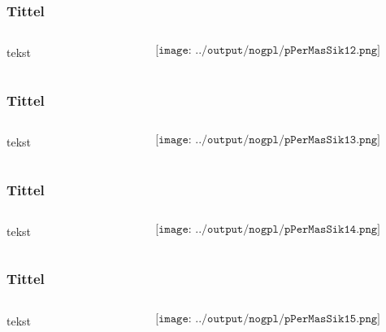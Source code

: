 \documentclass[aspectratio=169,xcolor=dvipsnames]{beamer}
\begin{document}
\begin{frame}
	\frametitle{Tittel}
	\begin{columns}
		\begin{column}{0.5\textwidth}
tekst
			
		\end{column}

		\begin{column}{0.5\textwidth}
	$$\texttt{[image: ../output/nogpl/pPerMasSik12.png]}$$
		\end{column}
	\end{columns}
\end{frame}

\begin{frame}
	\frametitle{Tittel}
	\begin{columns}
		\begin{column}{0.5\textwidth}
tekst
			
		\end{column}

		\begin{column}{0.5\textwidth}
	$$\texttt{[image: ../output/nogpl/pPerMasSik13.png]}$$
		\end{column}
	\end{columns}
\end{frame}

\begin{frame}
	\frametitle{Tittel}
	\begin{columns}
		\begin{column}{0.5\textwidth}
tekst
			
		\end{column}

		\begin{column}{0.5\textwidth}
	$$\texttt{[image: ../output/nogpl/pPerMasSik14.png]}$$
		\end{column}
	\end{columns}
\end{frame}

\begin{frame}
	\frametitle{Tittel}
	\begin{columns}
		\begin{column}{0.5\textwidth}
tekst
			
		\end{column}

		\begin{column}{0.5\textwidth}
	$$\texttt{[image: ../output/nogpl/pPerMasSik15.png]}$$
		\end{column}
	\end{columns}
\end{frame}
\end{document}

